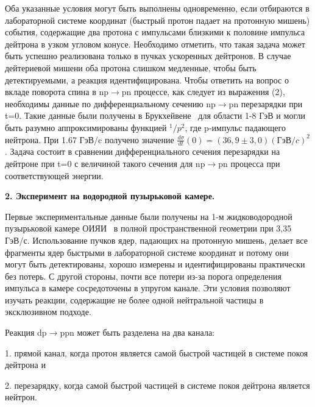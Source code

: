 \documentclass[a4paper,12pt]{article}
\begin{document}
{{    Оба указанные условия могут быть выполнены одновременно,
    если отбираются в лабораторной системе координат (быстрый
    протон падает на протонную мишень) события, содержащие два
    протона с импульсами близкими к половине импульса дейтрона
    в узком угловом конусе. Необхо\-димо отметить, что такая задача
    может быть успешно реализована только в пучках ускоренных
    дейтронов. В случае дейтериевой мишени оба протона слишком
    медленные, чтобы быть детектируемыми, а реакция идентифицирована.
    Чтобы ответить на вопрос о вкладе поворота
    спина в np$\to$pn процессе, как следует из выражения (2),
    необхо\-димы данные по дифференциальному сечению np$\to$pn
    перезарядки при t=0. Такие данные были получены в
    Брукхейвене~\cite{Fri}   для области 1-8 ГэВ и могли быть разумно
    аппроксимированы функцией $^1/p^2$, где p-импульс \hspace{0.1cm}
    падающе\-го нейтрона. При 1.67 ГэВ/c получено значение
    $\frac{d\sigma}{dt} (0)=(36,9\pm3,0)(ГэВ/c)^2$.
    Задача состоит в сравнении дифференциального сечения
    перезарядки на дейтроне при t=0 с величиной такого сечения для
    np$\to$pn процесса при соответствующей энергии.

    \vspace {10mm}

    \newpage
        {\Large\bf 2. Эксперимент на водородной пузырьковой камере.}

        \vspace {10mm}

        Первые экспериментальные данные были получены на
        1-м жидко\-водородной пузырьковой камере ОИЯИ~\cite{gla,ala}
        в полной пространственной геометрии при 3,35 ГэВ/с.
        Использование пучков ядер, падающих на протонную мишень, делает
        все фрагменты ядер быстрыми в лабораторной системе координат
        и потому они могут быть детектированы, хорошо измерены и
        идентифицированы практически без потерь.
        С другой стороны, почти все потери из-за порога определения
        импульса в камере сосредото\-чены в упругом канале.
        Эти условия позво\-ляют изучать реакции, содер\-жащие не более
        одной нейтральной частицы в эксклюзивном подходе.

        Реакция dp$\to$ppn может быть разделена на два
        канала:

        \vspace {8mm}
        1. прямой канал, когда протон является самой быстрой частицей
        в системе покоя дейтрона и

        \vspace {8mm}
        2. перезарядку, когда самой быстрой частицей в системе покоя
        дейтрона является нейтрон.

}}
\end{document}
